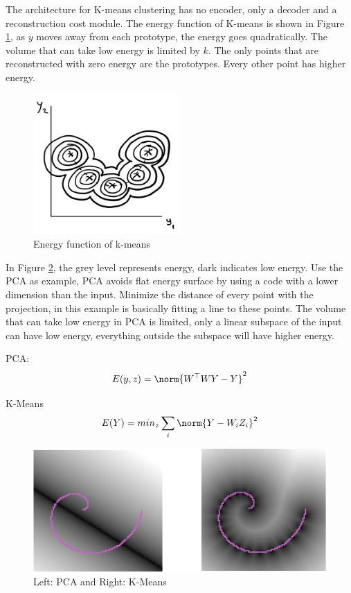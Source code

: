 The architecture for K-means clustering has no encoder, only a decoder and a reconstruction cost module. 
The energy function of K-means is shown in Figure \ref{figure3}, as $y$ moves away from each prototype, the energy goes quadratically. 
The volume that can take low energy is limited by $k$. 
The only points that are reconstructed with zero energy are the prototypes. Every other point has higher energy.

 \begin{figure}[H]
    \centering
    \includegraphics[width=0.5\textwidth]{lectures/10-b/image/pic9.png}
    \caption{Energy function of k-means}
    \label{figure3}
\end{figure}

In Figure \ref{figure4}, the grey level represents energy, dark indicates low energy. 
Use the PCA as example, PCA avoids flat energy surface by using a code with a lower dimension than the input. 
Minimize the distance of every point with the projection, in this example is basically fitting a line to these points. 
The volume that can take low energy in PCA is limited, only a linear subspace of the input can have low energy, everything outside the subspace will have higher energy. 

PCA:
\begin{equation}
E(y,z) =  \norm{W^\top WY -Y}^2
\end{equation}

K-Means
\begin{equation}
E(Y) =  min_z \sum_i\norm{Y-W_iZ_i}^2
\end{equation}

\begin{figure}[H]
    \centering
    \includegraphics[width=\textwidth]{lectures/10-b/image/pic1.png}
    \caption{Left: PCA and Right: K-Means}
    \label{figure4}
\end{figure}
   
